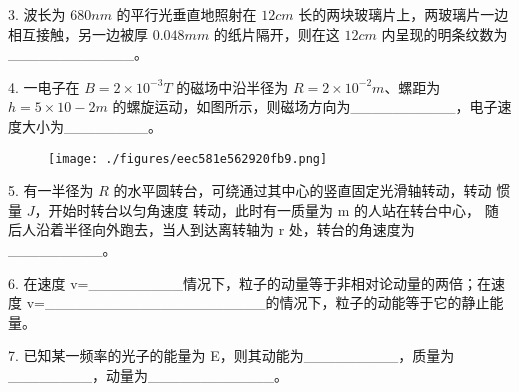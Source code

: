 3. 波长为 $680nm$ 的平行光垂直地照射在 $12cm$ 长的两块玻璃片上，两玻璃片一边相互接触，另一边被厚 $0.048mm$ 的纸片隔开，则在这 $12cm$ 内呈现的明条纹数为____________。

4. 一电子在 $B=2\times10^{-3}T$ 的磁场中沿半径为 $R=2\times10^{-2}m$、螺距为 $h=5\times10-2m$ 的螺旋运动，如图所示，则磁场方向为__________，电子速度大小为________。
\begin{figure}[ht]
\centering
\texttt{[image: ./figures/eec581e562920fb9.png]}
\caption{} \label{fig_NJUD4_2}
\end{figure}
5. 有一半径为 $R$ 的水平圆转台，可绕通过其中心的竖直固定光滑轴转动，转动
惯量 $J$，开始时转台以匀角速度 转动，此时有一质量为 m 的人站在转台中心，
随后人沿着半径向外跑去，当人到达离转轴为 r 处，转台的角速度为_________。

6. 在速度 v=_________情况下，粒子的动量等于非相对论动量的两倍；在速度
v=_____________________的情况下，粒子的动能等于它的静止能量。

7. 已知某一频率的光子的能量为 E，则其动能为_________，质量为________，动量为____________。